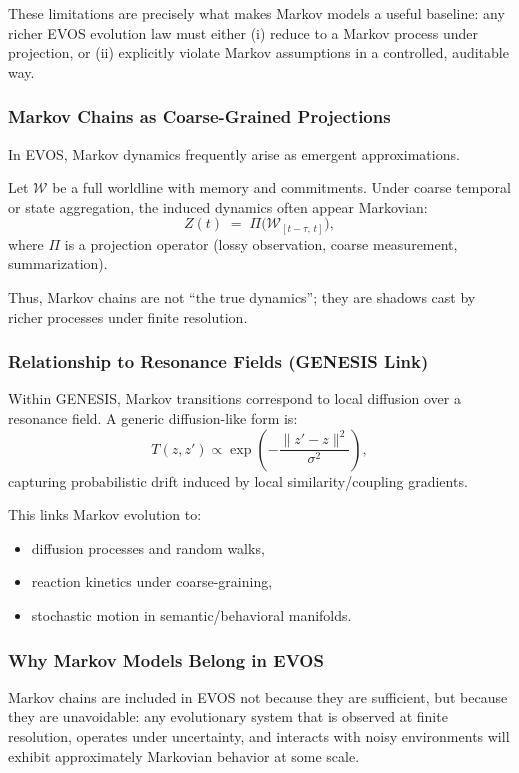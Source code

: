 \documentclass[11pt]{article}
\begin{document}
These limitations are precisely what makes Markov models a useful baseline: any richer
EVOS evolution law must either (i) reduce to a Markov process under projection, or (ii)
explicitly violate Markov assumptions in a controlled, auditable way.

\subsubsection{Markov Chains as Coarse-Grained Projections}

In EVOS, Markov dynamics frequently arise as emergent approximations.

Let $\mathcal{W}$ be a full worldline with memory and commitments. Under coarse temporal
or state aggregation, the induced dynamics often appear Markovian:
\[
Z(t) \;=\; \Pi\!\big(\mathcal{W}_{[t-\tau,\,t]}\big),
\]
where $\Pi$ is a projection operator (lossy observation, coarse measurement, summarization).

Thus, Markov chains are not ``the true dynamics''; they are shadows cast by richer
processes under finite resolution.

\subsubsection{Relationship to Resonance Fields (GENESIS Link)}

Within GENESIS, Markov transitions correspond to local diffusion over a resonance field.
A generic diffusion-like form is:
\[
T(z,z') \propto \exp\!\left(-\frac{\|z'-z\|^2}{\sigma^2}\right),
\]
capturing probabilistic drift induced by local similarity/coupling gradients.

This links Markov evolution to:
\begin{itemize}
  \item diffusion processes and random walks,
  \item reaction kinetics under coarse-graining,
  \item stochastic motion in semantic/behavioral manifolds.
\end{itemize}

\subsubsection{Why Markov Models Belong in EVOS}

Markov chains are included in EVOS not because they are sufficient, but because they are
unavoidable: any evolutionary system that is observed at finite resolution, operates
under uncertainty, and interacts with noisy environments will exhibit approximately
Markovian behavior at some scale.
\end{document}
